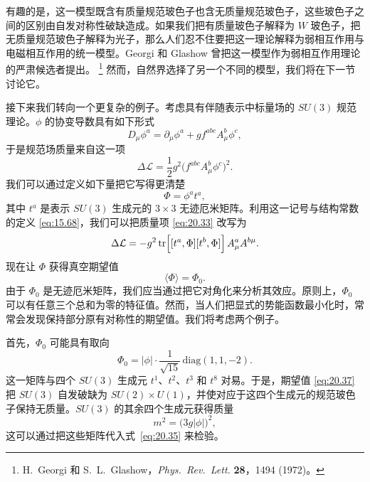 有趣的是，这一模型既含有质量规范玻色子也含无质量规范玻色子，这些玻色子之间的区别由自发对称性破缺造成。如果我们把有质量玻色子解释为 $W$ 玻色子，把无质量规范玻色子解释为光子，那么人们忍不住要把这一理论解释为弱相互作用与电磁相互作用的统一模型。Georgi 和 Glashow 曾把这一模型作为弱相互作用理论的严肃候选者提出。%
\footnote{H.~Georgi 和 S.~L.~Glashow，\emph{Phys.\ Rev.\ Lett.} \textbf{28}，1494 (1972)。} 然而，自然界选择了另一个不同的模型，我们将在下一节讨论它。

接下来我们转向一个更复杂的例子。考虑具有伴随表示中标量场的 $SU(3)$ 规范理论。$\phi$ 的协变导数具有如下形式
\begin{equation}
  D_\mu\phi^a = \partial_\mu\phi^a + gf^{abc}A^b_\mu\phi^c ,
  \label{eq:20.32}
\end{equation}
于是规范场质量来自这一项
\begin{equation}
  \Delta\mathcal{L} = \frac{1}{2}g^2\bigl( f^{abc}A^b_\mu\phi^c \bigr)^2 .
  \label{eq:20.33}
\end{equation}
我们可以通过定义如下量把它写得更清楚
\begin{equation}
  \Phi = \phi^a t^a ,
  \label{eq:20.34}
\end{equation}
其中 $t^a$ 是表示 $SU(3)$ 生成元的 $3\times3$ 无迹厄米矩阵。利用这一记号与结构常数的定义 \eqref{eq:15.68}，我们可以把质量项 \eqref{eq:20.33} 改写为
\begin{equation}
  \Delta\mathcal{L} = -g^2\,\mathrm{tr}\Bigl[ [t^a,\Phi][t^b,\Phi] \Bigr]\,
    A^a_\mu A^{b\mu} .
  \label{eq:20.35}
\end{equation}
现在让 $\Phi$ 获得真空期望值
\begin{equation}
  \langle\Phi\rangle = \Phi_0 .
  \label{eq:20.36}
\end{equation}
由于 $\Phi_0$ 是无迹厄米矩阵，我们应当通过把它对角化来分析其效应。原则上，$\Phi_0$ 可以有任意三个总和为零的特征值。然而，当人们把显式的势能函数最小化时，常常会发现保持部分原有对称性的期望值。我们将考虑两个例子。

首先，$\Phi_0$ 可能具有取向
\begin{equation}
  \Phi_0 = |\phi|\cdot\frac{1}{\sqrt{15}}\,
    \mathrm{diag}(1, 1, -2) .
  \label{eq:20.37}
\end{equation}
这一矩阵与四个 $SU(3)$ 生成元 $t^1$、$t^2$、$t^3$ 和 $t^8$ 对易。于是，期望值 \eqref{eq:20.37} 把 $SU(3)$ 自发破缺为 $SU(2)\times U(1)$，并使对应于这四个生成元的规范玻色子保持无质量。$SU(3)$ 的其余四个生成元获得质量
\begin{equation}
  m^2 = \bigl( 3g|\phi| \bigr)^2 ,
  \label{eq:20.40}
\end{equation}
这可以通过把这些矩阵代入式~\eqref{eq:20.35} 来检验。

